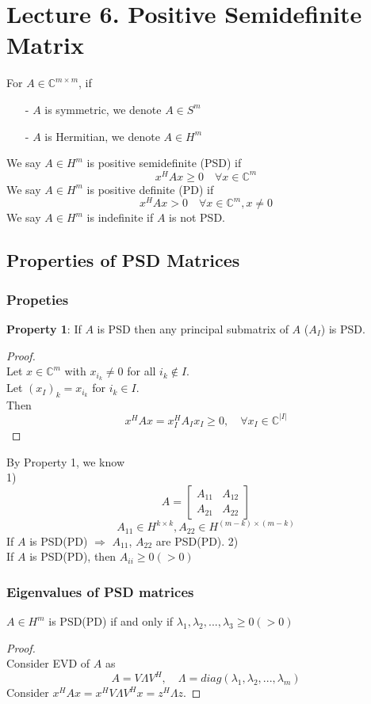 \section{Lecture 6. Positive Semidefinite Matrix}
\setcounter{theorem}{0}
\begin{multicols}{2}
For $A\in\mathbb{C}^{m\times m}$, if
\begin{itemize}
    \item [-] $A$ is symmetric, we denote $A\in S^m$
    \item [-] $A$ is Hermitian, we denote $A\in H^m$
\end{itemize}
\begin{definition}
    We say $A\in H^m$ is positive semidefinite (PSD) if 
    \[
        x^H A x \geq 0 \quad \forall x\in\mathbb{C}^m
    \]
    We say $A\in H^m$ is positive definite (PD) if 
    \[
        x^H A x > 0 \quad \forall x\in\mathbb{C}^m,x\neq 0
    \]
    We say $A\in H^m$ is indefinite if $A$ is not PSD.
\end{definition}
\subsection{Properties of PSD Matrices}
\subsubsection{Propeties}
\textbf{Property 1}: If $A$ is PSD then any principal submatrix of $A$ ($A_I$) is PSD. \\
\begin{proof} \\
    Let $x\in\mathbb{C}^m$ with $x_{i_k}\neq 0$ for all $i_k \notin I$. \\
    Let $(x_I)_k=x_{i_k}$ for $i_k\in I$. \\
    Then
    \[
        x^HAx = x_I^HA_Ix_I \geq 0,\quad \forall x_I\in \mathbb{C}^{|I|}
    \]
\end{proof}
By Property 1, we know \\
1) 
\[
    A = \begin{bmatrix}
        A_{11} & A_{12} \\ A_{21} & A_{22}
    \end{bmatrix}
\]
\[
    A_{11}\in H^{k\times k}, A_{22}\in H^{(m-k)\times (m-k)}
\]
If $A$ is PSD(PD) $\Longrightarrow$ $A_{11}$, $A_{22}$ are PSD(PD).
2) \\
If $A$ is PSD(PD), then $A_{ii}\geq 0(>0)$

\subsubsection{Eigenvalues of PSD matrices}
\begin{theorem}
    $A\in H^m$ is PSD(PD) if and only if $\lambda_1,\lambda_2,...,\lambda_3\geq 0(>0)$
\end{theorem}
\begin{proof} \\
    Consider EVD of $A$ as 
    \[
        A=V\Lambda V^H, \quad \Lambda=diag(\lambda_1,\lambda_2,...,\lambda_m)
    \]
    Consider $x^HAx=x^HV\Lambda V^Hx=z^H\Lambda z$. 


\end{proof}
\end{multicols}
